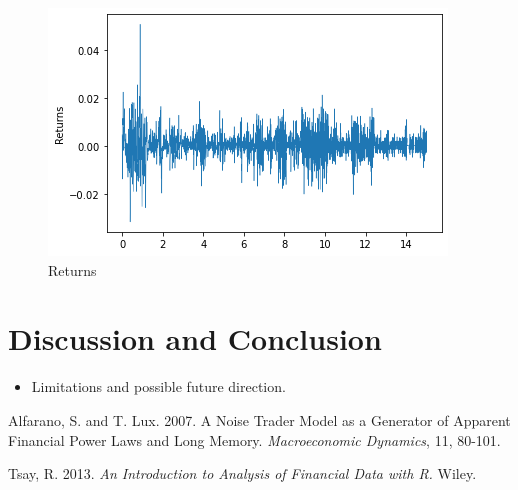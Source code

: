 \documentclass[11pt]{article}
\begin{document}
\begin{figure}
\begin{center}
\includegraphics[scale=0.3, trim=0.4cm 1.5cm 0cm 1cm]{returns.png}
\end{center}
\caption{Returns}
\label{fig:returns}
\end{figure}



















\section{Discussion and Conclusion}

\begin{itemize}
\item Limitations and possible future direction.
\end{itemize}

























\begin{thebibliography}{99} 

Alfarano, S. and T. Lux. 2007. A Noise Trader Model as a Generator of Apparent Financial Power Laws and Long Memory. {\em Macroeconomic Dynamics}, 11, 80-101.

Tsay, R. 2013. {\em An Introduction to Analysis of Financial Data with R.} Wiley. 

\end{thebibliography}
\end{document}
